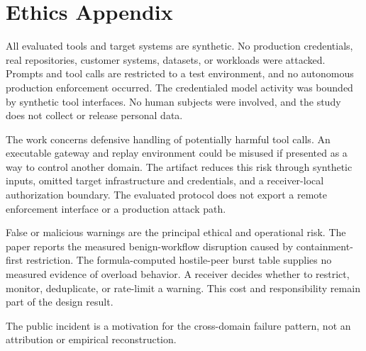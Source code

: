 \section{Ethics Appendix}

All evaluated tools and target systems are synthetic. No production credentials, real repositories, customer systems, datasets, or workloads were attacked. Prompts and tool calls are restricted to a test environment, and no autonomous production enforcement occurred. The credentialed model activity was bounded by synthetic tool interfaces. No human subjects were involved, and the study does not collect or release personal data.

The work concerns defensive handling of potentially harmful tool calls. An executable gateway and replay environment could be misused if presented as a way to control another domain. The artifact reduces this risk through synthetic inputs, omitted target infrastructure and credentials, and a receiver-local authorization boundary. The evaluated protocol does not export a remote enforcement interface or a production attack path.

False or malicious warnings are the principal ethical and operational risk. The paper reports the measured benign-workflow disruption caused by containment-first restriction. The formula-computed hostile-peer burst table supplies no measured evidence of overload behavior. A receiver decides whether to restrict, monitor, deduplicate, or rate-limit a warning. This cost and responsibility remain part of the design result.

The public incident is a motivation for the cross-domain failure pattern, not an attribution or empirical reconstruction.
